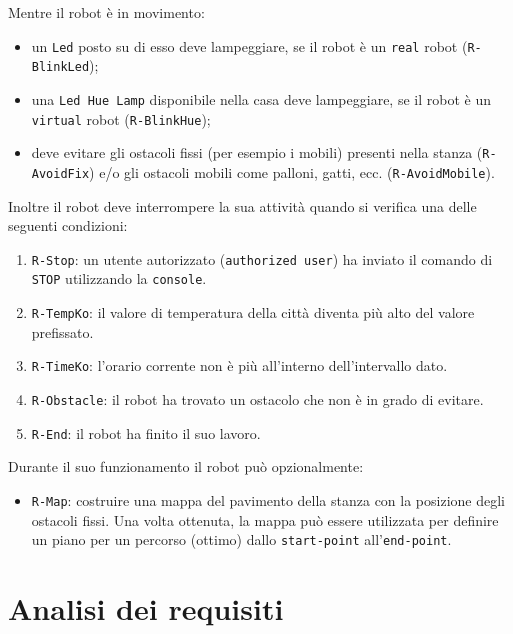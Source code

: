 \documentclass{llncs}
\newcommand{\action}[1]{\texttt{#1}\xspace}
\newcommand{\code}[1]{{\color{blue}\small{\texttt{#1}}}}
\newcommand{\fname}[1]{{\color{magenta}\small{\texttt{#1}}}}
\newcommand{\labelsec}[1]{\label{sec:#1}}
\begin{document}
Mentre il robot è in movimento:
\begin{itemize}
\item un \action{Led} posto su di esso deve lampeggiare, se il robot è un \fname{real} robot (\code{R-BlinkLed});
\item una \action{Led Hue Lamp} disponibile nella casa deve lampeggiare, se il robot è un \fname{virtual} robot (\code{R-BlinkHue});
\item deve evitare gli ostacoli fissi (per esempio i mobili) presenti nella stanza (\code{R-AvoidFix}) e/o gli ostacoli mobili come palloni, gatti, ecc. (\code{R-AvoidMobile}).
\end{itemize}

Inoltre il robot deve interrompere la sua attività quando si verifica una delle seguenti condizioni:
\begin{enumerate}
\item \code{R-Stop}: un utente autorizzato (\code{authorized user}) ha inviato il comando di \action{STOP} utilizzando la \code{console}.
\item \code{R-TempKo}: il valore di temperatura della città diventa più alto del valore prefissato.
\item \code{R-TimeKo}: l'orario corrente non è più all'interno dell'intervallo dato.
\item \code{R-Obstacle}: il robot ha trovato un ostacolo che non è in grado di evitare.
\item \code{R-End}: il robot ha finito il suo lavoro.
\end{enumerate}

Durante il suo funzionamento il robot può opzionalmente:
\begin{itemize}
\item \code{R-Map}: costruire una mappa del pavimento della stanza con la posizione degli ostacoli fissi. Una volta ottenuta, la mappa può essere utilizzata per definire un piano per un percorso (ottimo) dallo \code{start-point} all'\code{end-point}.
\end{itemize}


\section{Analisi dei requisiti}
\labelsec{ReqAnalysis}
\end{document}
